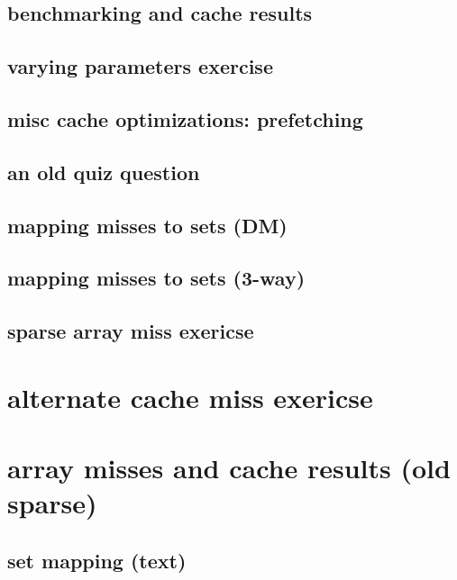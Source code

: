 \subsection{benchmarking and cache results}



\subsection{varying parameters exercise}


\subsection{misc cache optimizations: prefetching}


\subsection{an old quiz question}


\subsection{mapping misses to sets (DM)}

\subsection{mapping misses to sets (3-way)}


\subsection{sparse array miss exericse}


\section{alternate cache miss exericse}


\section{array misses and cache results (old sparse)}


\subsection{set mapping (text)}


